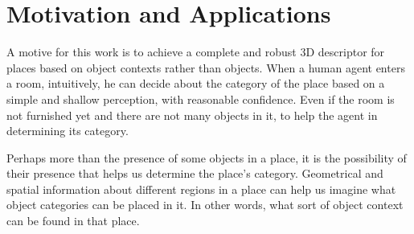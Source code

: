 % 

\section{Motivation and Applications}
\label{MotivationandApplications.sec}
A motive for this work is to achieve a complete and robust 3D descriptor for places based on object contexts 
rather than objects. 
When a human agent enters a room, intuitively, he can decide about the category of the place based on a simple and 
shallow perception, with reasonable confidence. 
Even if the room is not furnished yet and there are not many objects in it, to help the agent in determining its 
category. 

Perhaps more than the presence of some objects in a place, it is the possibility of their presence that helps us 
determine the place's category. Geometrical and spatial information about different regions in a place can help us imagine what object categories can be placed in it. In other words, what sort of object context can be found in that place. 

